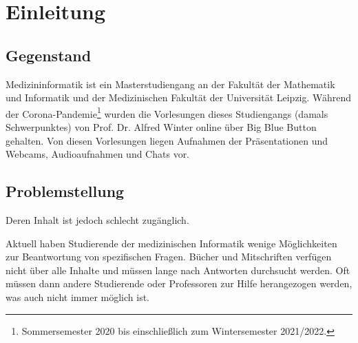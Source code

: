 \chapter{Einleitung}\label{ch:introduction}

\section{Gegenstand}

Medizininformatik ist ein Masterstudiengang an der Fakultät der Mathematik und Informatik und der Medizinischen Fakultät der Universität Leipzig.
Während der Corona-Pandemie\footnote{Sommersemester 2020 bis einschließlich zum Wintersemester 2021/2022.} wurden die Vorlesungen dieses Studiengangs (damals Schwerpunktes) von Prof. Dr. Alfred Winter online über Big Blue Button gehalten.
Von diesen Vorlesungen liegen Aufnahmen der Präsentationen und Webcams, Audioaufnahmen und Chats vor.





\section{Problemstellung}

Deren Inhalt ist jedoch schlecht zugänglich.

Aktuell haben Studierende der medizinischen Informatik wenige Möglichkeiten zur Beantwortung von spezifischen Fragen.
Bücher und Mitschriften verfügen nicht über alle Inhalte und müssen lange nach Antworten durchsucht werden.
Oft müssen dann andere Studierende oder Professoren zur Hilfe herangezogen werden, was auch nicht immer möglich ist.

